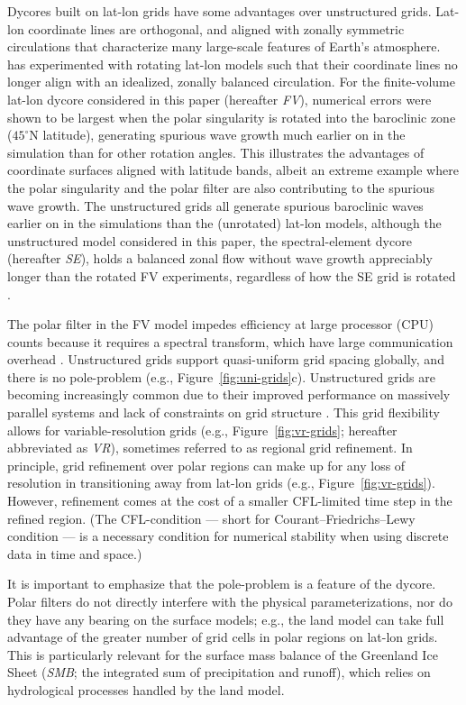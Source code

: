 \documentclass[draft]{agujournal2019}
\begin{document}
Dycores built on lat-lon grids have some advantages over unstructured grids. Lat-lon coordinate lines are orthogonal, and aligned with zonally symmetric circulations that characterize many large-scale features of Earth's atmosphere.  has experimented with rotating lat-lon models such that their coordinate lines no longer align with an idealized, zonally balanced circulation. For the finite-volume lat-lon dycore considered in this paper (hereafter \textit{FV}), numerical errors were shown to be largest when the polar singularity is rotated into the baroclinic zone ($45^{\circ}$N latitude), generating spurious wave growth much earlier on in the simulation than for other rotation angles. This illustrates the advantages of coordinate surfaces aligned with latitude bands, albeit an extreme example where the polar singularity and the polar filter are also contributing to the spurious wave growth. The unstructured grids all generate spurious baroclinic waves earlier on in the simulations than the (unrotated) lat-lon models, although the unstructured model considered in this paper, the spectral-element dycore (hereafter \textit{SE}), holds a balanced zonal flow without wave growth appreciably longer than the rotated FV experiments, regardless of how the SE grid is rotated \cite{LJTN2010JAMES}.

The polar filter in the FV model impedes efficiency at large processor (CPU) counts because it requires a spectral transform, which have large communication overhead \cite{ST1995GEOS,DetAl2012IJHPCA}. Unstructured grids support quasi-uniform grid spacing globally, and there is no pole-problem (e.g., Figure~\ref{fig:uni-grids}c). Unstructured grids are becoming increasingly common due to their improved performance on massively parallel systems and lack of constraints on grid structure \cite{PL2007JCP,DetAl2012IJHPCA,WETAL2013GMD}. This grid flexibility allows for variable-resolution grids (e.g., Figure~\ref{fig:vr-grids}; hereafter abbreviated as \textit{VR}), sometimes referred to as regional grid refinement. In principle, grid refinement over polar regions can make up for any loss of resolution in transitioning away from lat-lon grids (e.g., Figure~\ref{fig:vr-grids}).  However, refinement comes at the cost of a smaller CFL-limited time step in the refined region. (The CFL-condition --- short for Courant–Friedrichs–Lewy condition --- is a necessary condition for numerical stability when using discrete data in time and space.)

It is important to emphasize that the pole-problem is a feature of the dycore. Polar filters do not directly interfere with the physical parameterizations, nor do they have any bearing on the surface models; e.g., the land model can take full advantage of the greater number of grid cells in polar regions on lat-lon grids. This is particularly relevant for the surface mass balance of the Greenland Ice Sheet (\textit{SMB}; the integrated sum of precipitation and runoff), which relies on hydrological processes handled by the land model.
\end{document}
